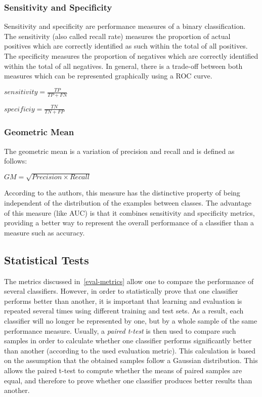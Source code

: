\newpage
\subsubsection{Sensitivity and Specificity} Sensitivity and specificity are performance measures of a binary classification. The sensitivity (also called recall rate) measures the proportion of actual positives which are correctly identified as such within the total of all positives. The specificity measures the proportion of negatives which are correctly identified within the total of all negatives.  In general, there is a trade-off between both measures which can be represented graphically using a ROC curve.
\begin{center}\(sensitivity = \frac{TP}{TP+FN}\)\end{center}
\begin{center}\(specificiy = \frac{TN}{TN+FP}\)\end{center}

\subsubsection{Geometric Mean}
The geometric mean is a variation of precision and recall and is defined as follows:
\begin{center}\(GM = \sqrt{Precision \times Recall}\)\end{center}
According to the authors, this measure has the distinctive property of being independent of the distribution of the examples between classes.  The advantage of this measure (like AUC) is that it combines sensitivity and specificity metrics, providing a better way to represent the overall performance of a classifier than a measure such as accuracy.

\newpage
\subsection{Statistical Tests}
The metrics discussed in~\ref{eval-metrics} allow one to compare the performance of several classifiers. However, in order to statistically prove that one classifier performs better than another, it is important that learning and evaluation is repeated several times using different training and test sets. As a result, each classifier will no longer be represented by one, but by a whole sample of the same performance measure. Usually, a \textit{paired t-test} is then used to compare such samples in order to calculate whether one classifier performs significantly better than another (according to the used evaluation metric). This calculation is based on the assumption that the obtained samples follow a Gaussian distribution. This allows the paired t-test to compute whether the means of paired samples are equal, and therefore to prove whether one classifier produces better results than another.


